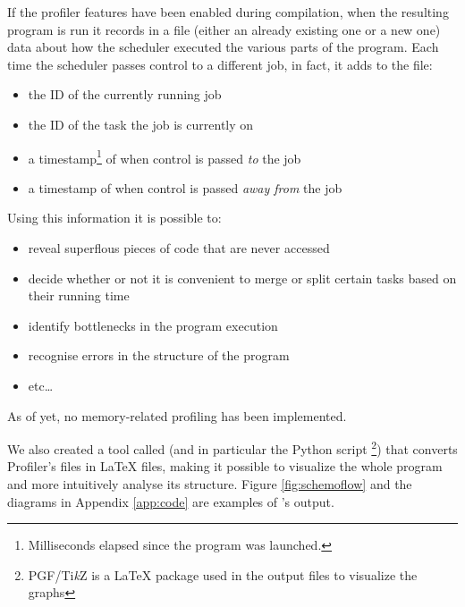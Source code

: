   If the profiler features have been enabled during compilation, when
  the resulting program is run it records in a  file
  (either an already existing one or a new one) data about how
  the scheduler executed the various parts of the program.
  Each time the scheduler passes control to a different job, in fact, it
  adds to the file:
  \begin{itemize}
    \item the ID of the currently running job
    \item the ID of the task the job is currently on
    \item a timestamp\footnote{\label{clock_note}Milliseconds elapsed
    since the program was launched.} of when control is passed
    \textit{to} the job
    \item a timestamp of when control is passed
    \textit{away from} the job
  \end{itemize}

  Using this information it is possible to:
  \begin{itemize}
    \item reveal superflous pieces of code that are never accessed
    \item decide whether or not it is convenient to merge or split
    certain tasks based on their running time
    \item identify bottlenecks in the program execution
    \item recognise errors in the structure of the program
    \item etc\ldots
  \end{itemize}
  As of yet, no memory-related profiling has been implemented.

  We also created a tool called \ScheMoTeX{} (and in particular the
  Python script \footnote{PGF/Ti\textit{k}Z is a
  \LaTeX{} package used in the output files to visualize the graphs})
  that converts \ScheMo{} Profiler's  files in \LaTeX{}
   files, making it possible to visualize the whole program
  and more intuitively analyse its structure. Figure
  \ref{fig:schemoflow} and the diagrams in Appendix \ref{app:code} are
  examples of \ScheMoTeX{}'s output.
